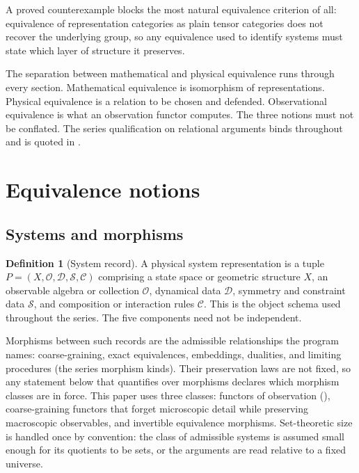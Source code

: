 \documentclass[11pt,letterpaper]{article}
\theoremstyle{definition}
\newtheorem{definition}[theorem]{Definition}
\theoremstyle{remark}
\begin{document}
A proved counterexample blocks the most natural equivalence criterion of all: equivalence of representation categories as plain tensor categories does not recover the underlying group, so any equivalence used to identify systems must state which layer of structure it preserves.

The separation between mathematical and physical equivalence runs through every section. Mathematical equivalence is isomorphism of representations. Physical equivalence is a relation to be chosen and defended. Observational equivalence is what an observation functor computes. The three notions must not be conflated. The series qualification on relational arguments binds throughout and is quoted in .



\section{Equivalence notions}
\label{sec:notions}

\subsection{Systems and morphisms}

\begin{definition}[System record]
\label{def:system}
A physical system representation is a tuple $P = (X, \mathcal{O}, \mathcal{D}, \mathcal{S}, \mathcal{C})$ comprising a state space or geometric structure $X$, an observable algebra or collection $\mathcal{O}$, dynamical data $\mathcal{D}$, symmetry and constraint data $\mathcal{S}$, and composition or interaction rules $\mathcal{C}$. This is the object schema used throughout the series. The five components need not be independent.
\end{definition}

Morphisms between such records are the admissible relationships the program names: coarse-graining, exact equivalences, embeddings, dualities, and limiting procedures (the series morphism kinds). Their preservation laws are not fixed, so any statement below that quantifies over morphisms declares which morphism classes are in force. This paper uses three classes: functors of observation (), coarse-graining functors that forget microscopic detail while preserving macroscopic observables, and invertible equivalence morphisms. Set-theoretic size is handled once by convention: the class of admissible systems is assumed small enough for its quotients to be sets, or the arguments are read relative to a fixed universe.
\end{document}
